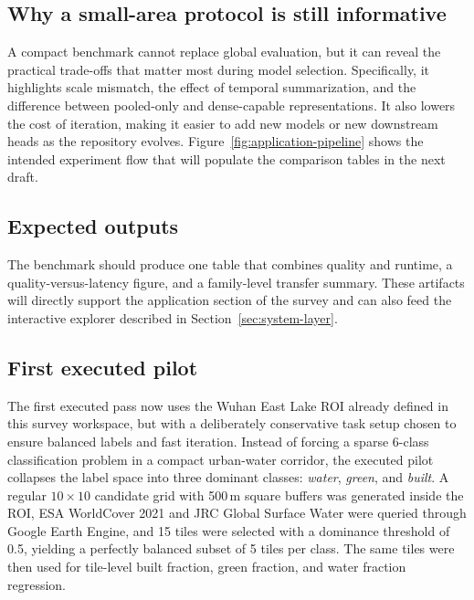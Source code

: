 \subsection{Why a small-area protocol is still informative}

A compact benchmark cannot replace global evaluation, but it can reveal the practical trade-offs that matter most during model selection. Specifically, it highlights scale mismatch, the effect of temporal summarization, and the difference between pooled-only and dense-capable representations. It also lowers the cost of iteration, making it easier to add new models or new downstream heads as the repository evolves. Figure~\ref{fig:application-pipeline} shows the intended experiment flow that will populate the comparison tables in the next draft.

\subsection{Expected outputs}

The benchmark should produce one table that combines quality and runtime, a quality-versus-latency figure, and a family-level transfer summary. These artifacts will directly support the application section of the survey and can also feed the interactive explorer described in Section~\ref{sec:system-layer}.

\subsection{First executed pilot}

The first executed pass now uses the Wuhan East Lake ROI already defined in this survey workspace, but with a deliberately conservative task setup chosen to ensure balanced labels and fast iteration. Instead of forcing a sparse 6-class classification problem in a compact urban-water corridor, the executed pilot collapses the label space into three dominant classes: \emph{water}, \emph{green}, and \emph{built}. A regular \(10 \times 10\) candidate grid with 500\,m square buffers was generated inside the ROI, ESA WorldCover 2021 and JRC Global Surface Water were queried through Google Earth Engine, and 15 tiles were selected with a dominance threshold of 0.5, yielding a perfectly balanced subset of 5 tiles per class. The same tiles were then used for tile-level built fraction, green fraction, and water fraction regression.

